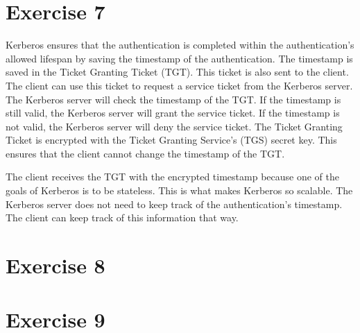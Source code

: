 \documentclass[twoside, a4paper, fleqn, reqno]{article}
\begin{document}
\section*{Exercise 7}

Kerberos ensures that the authentication is completed within the authentication's allowed lifespan
by saving the timestamp of the authentication. The timestamp is saved in the Ticket Granting Ticket (TGT).
This ticket is also sent to the client. The client can use this ticket to request a service ticket from the
Kerberos server. The Kerberos server will check the timestamp of the TGT. If the timestamp is still valid,
the Kerberos server will grant the service ticket. If the timestamp is not valid, the Kerberos server will
deny the service ticket.
The Ticket Granting Ticket is encrypted with the Ticket Granting Service's (TGS) secret key. This ensures
that the client cannot change the timestamp of the TGT.

The client receives the TGT with the encrypted timestamp because one of the goals of Kerberos is to
be stateless. This is what makes Kerberos so scalable. The Kerberos server does not need to keep track
of the authentication's timestamp. The client can keep track of this information that way.

\section*{Exercise 8}



\section*{Exercise 9}
\end{document}
